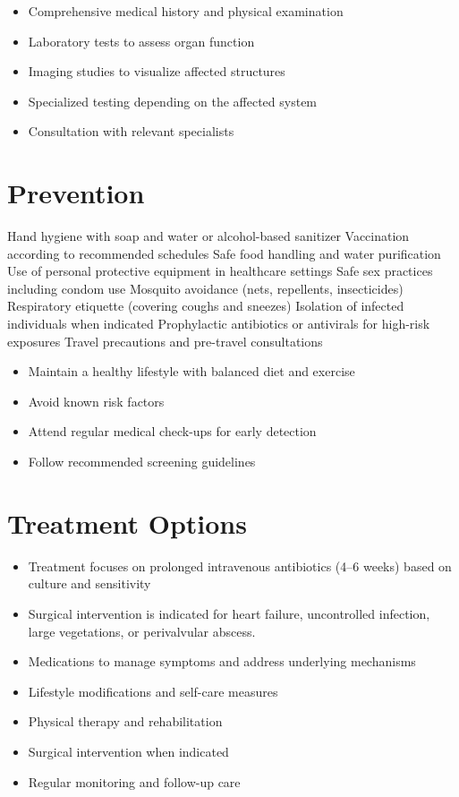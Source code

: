 \begin{itemize}[noitemsep]
  \item Comprehensive medical history and physical examination
  \item Laboratory tests to assess organ function
  \item Imaging studies to visualize affected structures
  \item Specialized testing depending on the affected system
  \item Consultation with relevant specialists
\end{itemize}
\section{Prevention}
Hand hygiene with soap and water or alcohol-based sanitizer Vaccination according to recommended schedules Safe food handling and water purification Use of personal protective equipment in healthcare settings Safe sex practices including condom use Mosquito avoidance (nets, repellents, insecticides) Respiratory etiquette (covering coughs and sneezes) Isolation of infected individuals when indicated Prophylactic antibiotics or antivirals for high-risk exposures Travel precautions and pre-travel consultations

\begin{itemize}[noitemsep]
  \item Maintain a healthy lifestyle with balanced diet and exercise
  \item Avoid known risk factors
  \item Attend regular medical check-ups for early detection
  \item Follow recommended screening guidelines
\end{itemize}
\section{Treatment Options}
\begin{itemize}[noitemsep]
  \item Treatment focuses on prolonged intravenous antibiotics (4--6 weeks) based on culture and sensitivity
  \item Surgical intervention is indicated for heart failure, uncontrolled infection, large vegetations, or perivalvular abscess.
  \item Medications to manage symptoms and address underlying mechanisms
  \item Lifestyle modifications and self-care measures
  \item Physical therapy and rehabilitation
  \item Surgical intervention when indicated
  \item Regular monitoring and follow-up care
\end{itemize}
